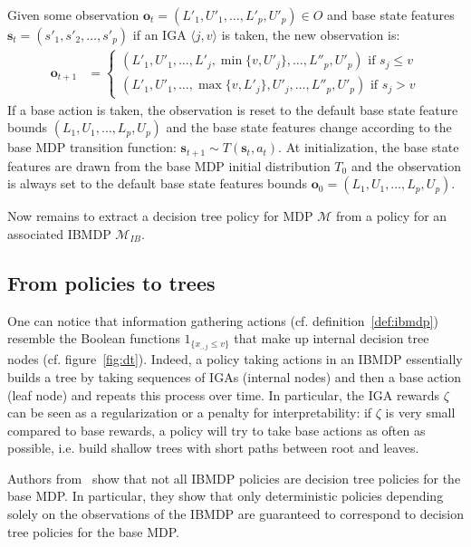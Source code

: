 \begin{definition}
\begin{itemize}
Given some observation $\boldsymbol{o}_t = (L'_1, U'_1, \dots, L'_p, U'_p) \in O$ and base state features $\boldsymbol{s}_t=(s'_1, s'_2, \dots, s'_p)$ if an IGA $\langle j, v \rangle$ is taken, the new observation is:
\begin{align*}
    \boldsymbol{o}_{t+1} &= \begin{cases}
        (L'_1, U'_1, \dots , L'_j, \min\{v, U'_j\}, \dots , L''_p, U'_p) \text{ if } s_j \leq v\\
        (L'_1, U'_1, \dots , \max\{v, L'_j\}, U'_j, \dots , L''_p, U'_p) \text{ if } s_j > v
    \end{cases}
\end{align*}
If a base action is taken, the observation is reset to the default base state feature bounds $(L_1, U_1,\dots, L_p, U_p)$ and the base state features change according to the base MDP transition function: $\boldsymbol{s}_{t+1}\sim T(\boldsymbol{s}_t, a_t)$.
At initialization, the base state features are drawn from the base MDP initial distribution $T_0$ and the observation is always set to the default base state features bounds $\boldsymbol{o}_0=(L_1, U_1,\dots, L_p, U_p)$.
\end{itemize}
\end{definition}

Now remains to extract a decision tree policy for MDP $\mathcal{M}$ from a policy for an associated IBMDP $\mathcal{M}_{IB}$. 

\subsection{From policies to trees}

One can notice that information gathering actions (cf. definition~\ref{def:ibmdp}) resemble the Boolean functions $1_{\{x_{\_, j} \leq v\}}$ that make up internal decision tree nodes (cf. figure~\ref{fig:dt}).
Indeed, a policy taking actions in an IBMDP essentially builds a tree by taking sequences of IGAs (internal nodes) and then a base action (leaf node) and repeats this process over time.
In particular, the IGA rewards $\zeta$ can be seen as a regularization or a penalty for interpretability: if $\zeta$ is very small compared to base rewards, a policy will try to take base actions as often as possible, i.e. build shallow trees with short paths between root and leaves.

Authors from~\cite{topin2021iterative} show that not all IBMDP policies are decision tree policies for the base MDP.
In particular, they show that only deterministic policies depending solely on the observations of the IBMDP are guaranteed to correspond to decision tree policies for the base MDP.

